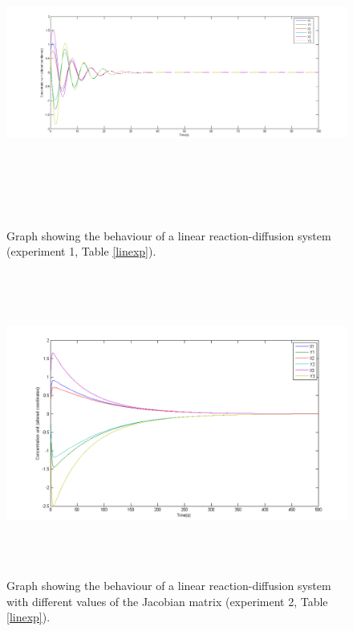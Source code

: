 \begin{figure}
\centering
\includegraphics[width=15cm, height=10cm]{l1.png}
\caption{Graph showing the behaviour of a linear reaction-diffusion system (experiment 1, Table \ref{linexp}).}
\label{l1}
\end{figure}

\begin{figure}
\centering
\includegraphics[width=15cm, height=10cm]{l2.png}
\caption{Graph showing the behaviour of a linear reaction-diffusion system with different values of the Jacobian matrix (experiment 2, Table \ref{linexp}).}
\label{l2}
\end{figure}

